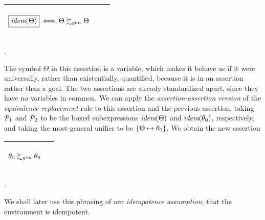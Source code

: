 \documentclass[runningheads]{llncs}
\DeclareMathOperator{\uiff}{\iff}
\DeclareMathOperator{\idem}{\emph{idem}}
\begin{document}
\begin{center}
\begin{tabularx}{1.0\textwidth} { 
  | >{\raggedright\arraybackslash}X 
  | >{\raggedright\arraybackslash}X 
  || >{\raggedright\arraybackslash}X | }
 \hline 
 \begin{center}
    \vspace{-.25cm}
$\begin{aligned}\boxed{\idem(\Theta)} \uiff  \Theta \moregen \Theta \end{aligned}$
\end{center}
  & 
  &  \\ \hline
\end{tabularx}.
\end{center}
 The symbol $\Theta$ in this assertion is a variable, which makes it behave as if it were universally, rather than existentially, quantified, because it is in an assertion rather than a goal. The two assertions are already standardized apart, since they have no variables in common. We can apply the \emph{assertion-assertion version} of the \emph{equivalence replacement} rule to this assertion and the previous assertion,  taking ${\mathcal{P}}_{1}$ and  ${\mathcal{P}}_{2}$ to be the boxed subexpressions  $\idem(\Theta)$ and $\idem(\thet{0})$, respectively, and taking the most-general unifier to be $\{\Theta \mapsto \theta_{0}\}$. We obtain the new assertion

\begin{center}
\begin{tabularx}{1.0\textwidth}{V}
 \hline 
 \begin{center}
 \vspace{-.25cm}
$\begin{aligned} \theta_{0} \succsim_{gen} \theta_{0} \end{aligned}$
\end{center}
  & 
  &  \\ \hline
\end{tabularx}.
\end{center}
\noindent We shall later use this phrasing of our \emph{idempotence assumption}, that the environment is idempotent. 
 
\end{document}
